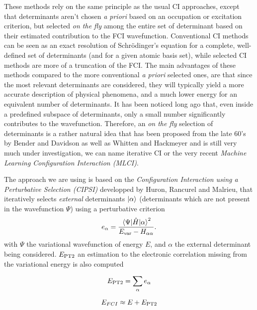 \documentclass[./thesis.tex]{subfiles}
\begin{document}
These methods rely on the same principle as the usual CI approaches, except that determinants aren't chosen \textit{a priori} based on an occupation or excitation criterion, but selected \emph{on the fly} among the entire set of determinant based on their estimated contribution to the FCI wavefunction. Conventional CI methods can be seen as an exact resolution of Schrödinger's equation for a complete, well-defined set of determinants (and for a given atomic basis set), while selected CI methods are more of a truncation of the FCI.
The main advantages of these methods compared to the more conventional \textit{a priori} selected ones, are that since the most relevant determinants are considered, they will typically yield a more accurate description of physical phenomena, and a much lower energy for an equivalent number of determinants.
It has been noticed long ago that, even inside a predefined subspace of determinants, only a small number significantly contributes to the wavefunction. Therefore, an \emph{on the fly} selection of determinants is a rather natural idea that has been proposed from the late 60's by Bender and Davidson\cite{Bender_1969} as well as Whitten and Hackmeyer\cite{Whitten_1969} and is still very much under investigation, we can name iterative CI\cite{Liu_2016} or the very recent \emph{Machine Learning Configuration Interaction (MLCI)}.\cite{1808.05787}

The approach we are using is based on the \emph{Configuration Interaction using a Perturbative Selection (CIPSI)} developped by Huron, Rancurel and Malrieu,\cite{Huron_1973} that iteratively selects \emph{external} determinants ${\ket{\alpha}}$ (determinants which are not present in the wavefunction $\Psi$) using a perturbative criterion
\begin{equation}
e_\alpha = \frac{\mel{\Psi}{\hat{H}}{\alpha}^2}{E_\text{var} - H_{\alpha \alpha}}.
\end{equation}
with $\Psi$ the variational wavefunction of energy $E$, and $\alpha$ the external determinant being considered. $E_\text{PT2}$ an estimation to the electronic correlation missing from the variational energy is also computed


\begin{equation}
E_\text{PT2} = \sum_{\alpha} e_\alpha
\end{equation}

\begin{equation}
E_{FCI} \approx E + E_\text{PT2}
\end{equation}
\end{document}
